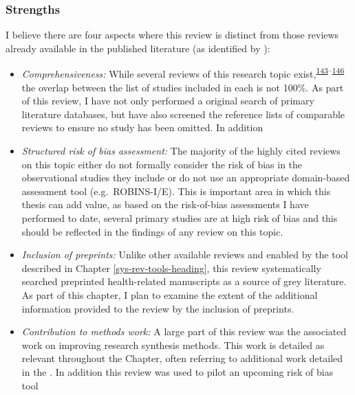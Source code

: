 \documentclass[a4paper, twoside]{templates/ociamthesis}
\providecommand{\tightlist}{%
  \setlength{\itemsep}{0pt}\setlength{\parskip}{0pt}}
\begin{document}
\hypertarget{strengths}{%
\subsubsection{Strengths}\label{strengths}}

I believe there are four aspects where this review is distinct from those reviews already available in the published literature (as identified by ):

\begin{itemize}
\item
  \emph{Comprehensiveness:} While several reviews of this research topic exist,\textsuperscript{\protect\hyperlink{ref-chu2018}{143}--\protect\hyperlink{ref-poly2020}{146}} the overlap between the list of studies included in each is not 100\%. As part of this review, I have not only performed a original search of primary literature databases, but have also screened the reference lists of comparable reviews to ensure no study has been omitted. In addition
\item
  \emph{Structured risk of bias assessment:} The majority of the highly cited reviews on this topic either do not formally consider the risk of bias in the observational studies they include or do not use an appropriate domain-based assessment tool (e.g.~ROBINS-I/E). This is important area in which this thesis can add value, as based on the risk-of-bias assessments I have performed to date, several primary studies are at high risk of bias and this should be reflected in the findings of any review on this topic.
\item
  \emph{Inclusion of preprints:} Unlike other available reviews and enabled by the tool described in Chapter \ref{sys-rev-tools-heading}, this review systematically searched preprinted health-related manuscripts as a source of grey literature. As part of this chapter, I plan to examine the extent of the additional information provided to the review by the inclusion of preprints.
\end{itemize}

\begin{itemize}
\tightlist
\item
  \emph{Contribution to methods work:} A large part of this review was the associated work on improving research synthesis methods. This work is detailed as relevant throughout the Chapter, often referring to additional work detailed in the . In addition this review was used to pilot an upcoming risk of bias tool
\end{itemize}
\end{document}
